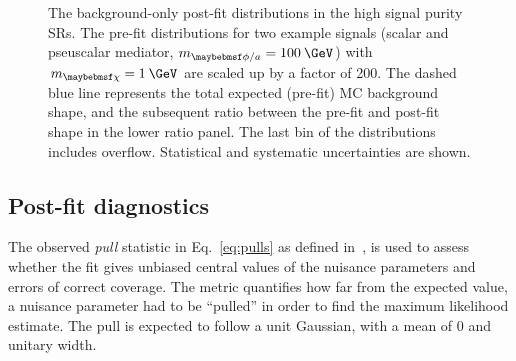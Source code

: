 \begin{figure}[htbp!]
  \caption{The background-only post-fit \ptmiss distributions in the high signal purity SRs. The pre-fit \ptmiss distributions for two example signals (scalar and pseuscalar mediator, $m_{\phi/a}=100\:\GeV$) with $m_{\chi}=1\:\GeV$ are scaled up by a factor of 200. The dashed blue line represents the total expected (pre-fit) MC background \ptmiss shape, and the subsequent ratio between the pre-fit and post-fit shape in the lower ratio panel. The last bin of the distributions includes overflow. Statistical and systematic uncertainties are shown.}
  \label{fig:postfit_hi}
\end{figure}

\subsection{Post-fit diagnostics}

The observed \textit{pull} statistic in Eq.~\ref{eq:pulls} as defined in~\cite{Karbach:2012vg}, is used to assess whether the fit gives unbiased central values of the nuisance parameters and errors of correct coverage. The metric quantifies how far from the expected value, a nuisance parameter had to be ``pulled'' in order to find the maximum likelihood estimate. The pull is expected to follow a unit Gaussian, with a mean of 0 and unitary width.

